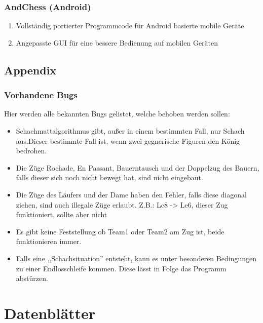 \documentclass[12pt,a4paper]{article}
\begin{document}
{\subsubsection{AndChess (Android)}

\begin{enumerate}
	\item{Vollständig portierter Programmcode für Android basierte mobile Geräte}
	\item{Angepasste GUI für eine bessere Bedienung auf mobilen Geräten}
\end{enumerate}

\subsection{Appendix}
\subsubsection{Vorhandene Bugs}

Hier werden alle bekannten Bugs gelistet, welche behoben werden sollen:

\begin{itemize}
	\item{Schachmattalgorithmus gibt, außer in einem bestimmten Fall, nur Schach aus.Dieser bestimmte Fall ist, wenn zwei gegnerische Figuren den König bedrohen.}
	\item{Die Züge Rochade, En Passant, Bauerntausch und der Doppelzug des Bauern, falls dieser sich noch nicht bewegt hat, sind nicht eingebaut.}
	\item{Die Züge des Läufers und der Dame haben den Fehler, falls diese diagonal ziehen, sind auch illegale Züge erlaubt. Z.B.: Lc8 -> Le6, dieser Zug funktioniert, sollte aber nicht}
	\item{Es gibt keine Feststellung ob Team1 oder Team2 am Zug ist, beide funktionieren immer.}
	\item{Falls eine ,,Schachsituation'' entsteht, kann es unter besonderen Bedingungen zu einer Endlosschleife kommen. Diese lässt in Folge das Programm abstürzen.}
\end{itemize}

\renewcommand\thesection{VI}
\section{Datenblätter}
\label{SEC:DATASHEET}



}
\end{document}
